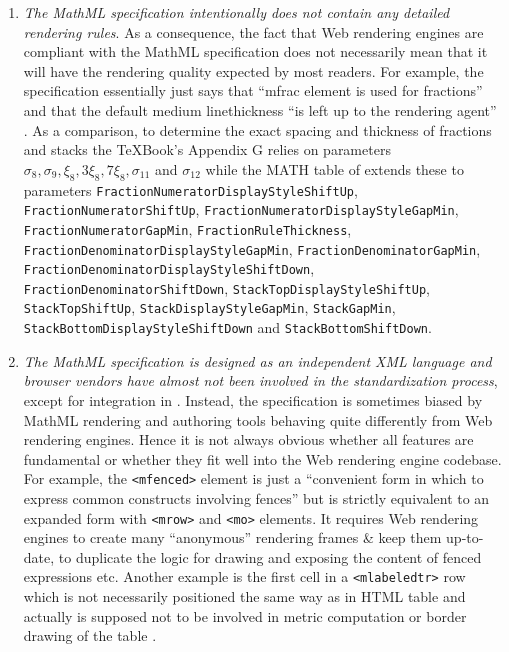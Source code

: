 \begin{enumerate}
\item {\em The MathML specification intentionally does not contain any detailed
  rendering rules}. As a consequence, the fact that Web rendering engines are
  compliant with the MathML specification does not necessarily mean that it
  will have the rendering quality expected by most readers.
  For example, the specification essentially just says that
  ``mfrac element is used for fractions'' and that the default medium
  linethickness ``is left up to the rendering agent'' \cite{MathML3}.
  As a comparison, to determine the exact spacing and thickness of
  fractions and stacks the
  \TeX Book's Appendix G \cite{TeXBook} relies
  on parameters $\sigma_8, \sigma_9, \xi_8, {3\xi_8}, {7\xi_8}, \sigma_{11}$ and
  $\sigma_{12}$ while the MATH table of \cite{OpenFontFormat3} extends these to
  parameters
  {\tt FractionNumeratorDisplayStyleShiftUp},
  {\tt FractionNumeratorShiftUp},
  {\tt FractionNumeratorDisplayStyleGapMin},
  {\tt FractionNumeratorGapMin},
  {\tt FractionRuleThickness},
  {\tt FractionDenominatorDisplayStyleGapMin},
  {\tt FractionDenominatorGapMin},
  {\tt FractionDenominatorDisplayStyleShiftDown},
  {\tt FractionDenominatorShiftDown},
  {\tt StackTopDisplayStyleShiftUp},
  {\tt StackTopShiftUp},
  {\tt StackDisplayStyleGapMin},
  {\tt StackGapMin},
  {\tt StackBottomDisplayStyleShiftDown} and
  {\tt StackBottomShiftDown}.
\item {\em The MathML specification is designed as an independent
  XML language and browser vendors have almost not been involved in the
  standardization process},
  except for integration in \cite{HTML5}.
  Instead, the specification is sometimes biased by MathML rendering and
  authoring tools behaving quite differently from Web rendering engines.
  Hence it is not always obvious whether all features are fundamental or
  whether they fit well into the Web rendering engine codebase.
  For example, the {\tt <mfenced>} element is just a
  ``convenient form in which to express common constructs involving fences''
  but is strictly equivalent to an expanded form with {\tt <mrow>} and
  {\tt <mo>} elements. It requires Web rendering engines
  to create many ``anonymous''
  rendering frames \& keep them up-to-date, to duplicate the logic
  for drawing and exposing the content of fenced expressions etc.
  Another example is the first cell in a
  {\tt <mlabeledtr>} row which is not necessarily positioned the same way as
  in HTML table and actually is supposed not to be involved in metric
  computation or border drawing of the table \cite{MathML3}.
\end{enumerate}

